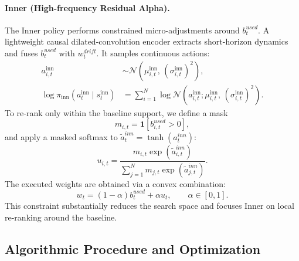 \documentclass[letterpaper]{article} %
\begin{document}
\paragraph{Inner (High-frequency Residual Alpha).}
The Inner policy performs constrained micro-adjustments around $b_t^{used}$.
A lightweight causal dilated-convolution encoder extracts short-horizon dynamics and fuses $b_t^{used}$ with
$w_t^{drift}$. It samples continuous actions:
\begin{equation}
\begin{aligned}
a^{\mathrm{inn}}_{i,t}
&\sim \mathcal{N}\!\left(\mu^{\mathrm{inn}}_{i,t},\,(\sigma^{\mathrm{inn}}_{i,t})^2\right),\\
\log \pi_{\mathrm{inn}}\!\left(a_t^{\mathrm{inn}} \mid s_t^{\mathrm{inn}}\right)
&= \sum_{i=1}^{N}
\log \mathcal{N}\!\left(
a^{\mathrm{inn}}_{i,t};
\mu^{\mathrm{inn}}_{i,t},\,(\sigma^{\mathrm{inn}}_{i,t})^2
\right).
\end{aligned}
\end{equation}
To re-rank only within the baseline support, we define a mask
\begin{equation}
m_{i,t}=\mathbf{1}[b^{used}_{i,t}>0],
\end{equation}
and apply a masked softmax to $\tilde a_t^{inn}=\tanh(a_t^{inn})$:
\begin{equation}
u_{i,t}=
\frac{m_{i,t}\exp(\tilde a^{inn}_{i,t})}{\sum_{j=1}^{N} m_{j,t}\exp(\tilde a^{inn}_{j,t})}.
\end{equation}
The executed weights are obtained via a convex combination:
\begin{equation}
w_t=(1-\alpha)b_t^{used}+\alpha u_t,\qquad \alpha\in[0,1].
\end{equation}
This constraint substantially reduces the search space and focuses Inner on local re-ranking around the baseline.

\subsection{Algorithmic Procedure and Optimization}
\label{sec:opt}
\end{document}
